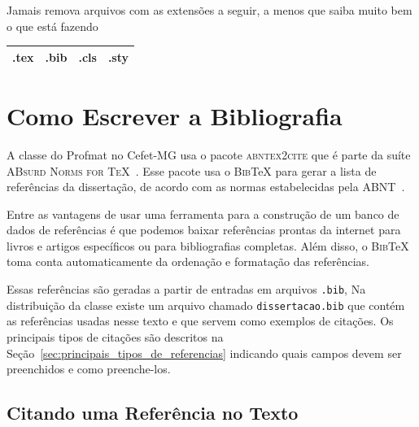 \documentclass[fleqn]{icat-ufal}
\newcommand{\BibTeX}   {\textsc{Bib}\TeX}
\newcommand{\bibfile}  {\texttt{dissertacao.bib}}
\begin{document}
Jamais remova arquivos com as extensões a seguir, a menos que saiba muito bem 
o que está fazendo
\begin{center}
    \begin{tabular}{cccc}    \hline
        \textsf{.tex} & \textsf{.bib} & \textsf{.cls} & \textsf{.sty} \\
        \hline
    \end{tabular}
\end{center}

\chapter{Como Escrever a Bibliografia}
\label{cap:como_escrever_a_bibliografia}


A classe do Profmat no Cefet-MG usa o pacote \textsc{abntex2cite}
que é parte da suíte \textsc{ABsurd Norms for TeX}~\cite{ABNTEX}.
Esse pacote usa o \BibTeX{} 
para gerar a lista de referências da dissertação, de acordo com as normas 
estabelecidas pela ABNT~\cite{NBR6023:2000}.

Entre as vantagens de usar uma ferramenta para a construção 
de um banco de dados de referências é que podemos baixar referências prontas da
internet para livros e artigos específicos ou para bibliografias
completas. Além disso, o \BibTeX{} toma conta automaticamente da ordenação
e formatação das referências. 

Essas referências são geradas a partir de entradas em arquivos \texttt{.bib},
Na distribuição da classe existe um arquivo chamado 
\bibfile{} que contém as referências usadas nesse 
texto e que servem como exemplos de citações. 
Os principais tipos de citações são descritos na 
Seção~\ref{sec:principais_tipos_de_referencias} indicando quais campos
devem ser preenchidos e como preenche-los.

\section{Citando uma Referência no Texto}
\label{sec:citando_uma_referencia_no_texto}
\end{document}
